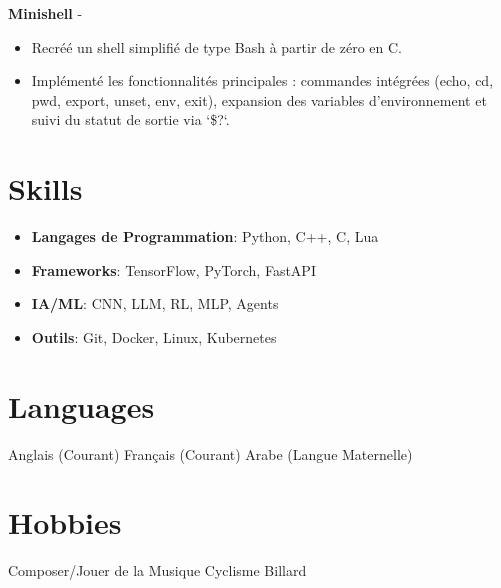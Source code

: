 \documentclass[a4paper,11pt]{article}%
\begin{document}
%
\noindent \textbf{Minishell} - \href{https://github.com/sboof911/minishell}{{}}%
\begin{itemize}[leftmargin=2em,label={},parsep=0pt,topsep=1em]%
\item Recr\'e\'e un shell simplifi\'e de type Bash \`a partir de z\'ero en C.%
\item Impl\'ement\'e les fonctionnalit\'es principales : commandes int\'egr\'ees (echo, cd, pwd, export, unset, env, exit), expansion des variables d'environnement et suivi du statut de sortie via `\$?`.%
\end{itemize}%
\section*{Skills}%
\begin{itemize}[leftmargin=*]%
\item \textbf{Langages de Programmation}: Python, C++, C, Lua%
\item \textbf{Frameworks}: TensorFlow, PyTorch, FastAPI%
\item \textbf{IA/ML}: CNN, LLM, RL, MLP, Agents%
\item \textbf{Outils}: Git, Docker, Linux, Kubernetes%
\end{itemize}%
\section*{Languages}%
Anglais (Courant)%
\newline%
%
Fran\c{c}ais (Courant)%
\newline%
%
Arabe (Langue Maternelle)%
\newline%
%
\section*{Hobbies}%
Composer/Jouer de la Musique%
\newline%
%
Cyclisme%
\newline%
%
Billard%
\newline%
%
\end{document}
